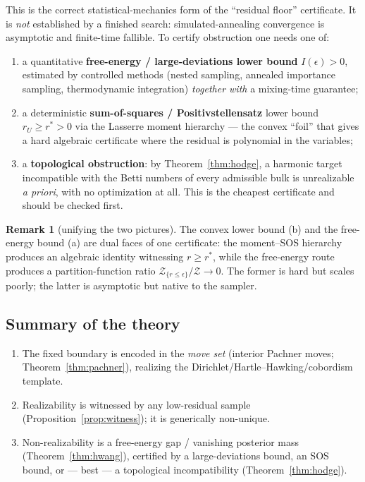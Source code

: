 \documentclass[11pt]{article}
\theoremstyle{definition}
\newtheorem{remark}[definition]{Remark}
\theoremstyle{plain}
\begin{document}
This is the correct statistical-mechanics form of the ``residual floor'' certificate. It is
\emph{not} established by a finished search: simulated-annealing convergence
\cite{geman1984,hajek1988} is asymptotic and finite-time fallible. To certify obstruction
one needs one of:
\begin{enumerate}[label=(\alph*),leftmargin=2.4em]
\item a quantitative \textbf{free-energy / large-deviations lower bound} $I(\epsilon)>0$,
estimated by controlled methods (nested sampling, annealed importance sampling, thermodynamic
integration) \emph{together with} a mixing-time guarantee;
\item a deterministic \textbf{sum-of-squares / Positivstellensatz} lower bound
$r_U\ge r^{*}>0$ via the Lasserre moment hierarchy \cite{lasserre2001} --- the convex
``foil'' that gives a hard algebraic certificate where the residual is polynomial in the
variables;
\item a \textbf{topological obstruction}: by Theorem~\ref{thm:hodge}, a harmonic target
incompatible with the Betti numbers of every admissible bulk is unrealizable \emph{a
priori}, with no optimization at all. This is the cheapest certificate and should be checked
first.
\end{enumerate}

\begin{remark}[unifying the two pictures]
The convex lower bound (b) and the free-energy bound (a) are dual faces of one certificate:
the moment--SOS hierarchy produces an algebraic identity witnessing $r\ge r^{*}$, while the
free-energy route produces a partition-function ratio
$\mathcal{Z}_{\{r\le\epsilon\}}/\mathcal{Z}\to0$. The former is hard but scales poorly; the
latter is asymptotic but native to the sampler.
\end{remark}

\subsection{Summary of the theory}

\begin{enumerate}[leftmargin=2.4em]
\item The fixed boundary is encoded in the \emph{move set} (interior Pachner moves;
Theorem~\ref{thm:pachner}), realizing the Dirichlet/Hartle--Hawking/cobordism template.
\item Realizability is witnessed by any low-residual sample
(Proposition~\ref{prop:witness}); it is generically non-unique.
\item Non-realizability is a free-energy gap / vanishing posterior mass
(Theorem~\ref{thm:hwang}), certified by a large-deviations bound, an SOS bound, or --- best
--- a topological incompatibility (Theorem~\ref{thm:hodge}).
\end{enumerate}
\end{document}
